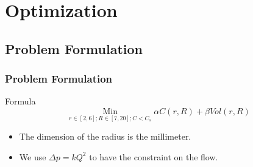 \documentclass[xcolor=dvipsnames,10pt]{beamer}
\begin{document}
\section{Optimization}

\subsection{Problem Formulation}
\begin{frame}
\frametitle{Problem Formulation}
\begin{block}{Formula}
\begin{equation}
\mathop{Min}\limits _{r\in [2,6];R\in [7,20];C<C_s} \alpha C(r,R) + \beta Vol(r,R) 
\end{equation}
\end{block}
\begin{itemize}
\item The dimension of the radius is the millimeter.\\
\item We use $\Delta p = kQ^2$ to have the constraint on the flow.
\end{itemize}
\end{frame}
\end{document}
